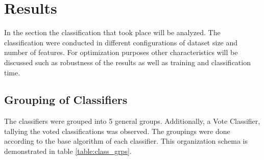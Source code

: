 \section{Results}
	In the section the classification that took place will be analyzed. The classification were conducted in different configurations of  dataset size and number of features. For optimization purposes other characteristics will be discussed such as robustness of the results as well as training and classification time.
	
	\subsection{Grouping of Classifiers}
		The classifiers were grouped into 5 general groups. Additionally, a Vote Classifier, tallying the voted classifications was observed. The groupings were done according to the base algorithm of each classifier. This organization schema is demonstrated in table \ref{table:class_grps}.
		
